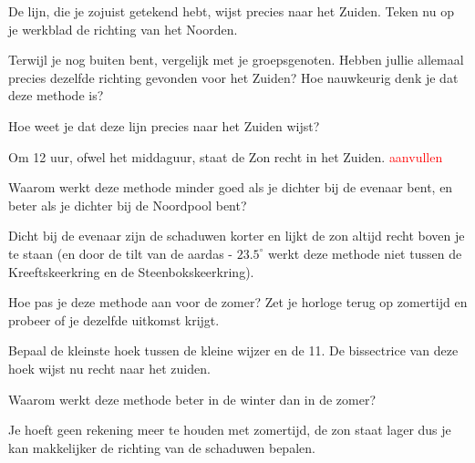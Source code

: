 De lijn, die je zojuist getekend hebt, wijst precies naar het Zuiden. Teken nu op je werkblad de richting van het Noorden.

\begin{opgave}[\discussie]
    Terwijl je nog buiten bent, vergelijk met je groepsgenoten. Hebben jullie allemaal precies dezelfde richting gevonden voor het Zuiden? Hoe nauwkeurig denk je dat deze methode is?
\end{opgave}

\begin{opgave}
    Hoe weet je dat deze lijn precies naar het Zuiden wijst?
    \begin{antwoord}
        Om 12 uur, ofwel het middaguur, staat de Zon recht in het Zuiden. \textcolor{red}{aanvullen}
    \end{antwoord}
\end{opgave}

\begin{opgave}
    Waarom werkt deze methode minder goed als je dichter bij de evenaar bent, en beter als je dichter bij de Noordpool bent? 
    \begin{antwoord}
        Dicht bij de evenaar zijn de schaduwen korter en lijkt de zon altijd recht boven je te staan (en door de tilt van de aardas - $23.5^{\circ}$ werkt deze methode niet tussen de Kreeftskeerkring en de Steenbokskeerkring).
    \end{antwoord}
\end{opgave}

\begin{opgave}[\schaar]
    Hoe pas je deze methode aan voor de zomer? Zet je horloge terug op zomertijd en probeer of je dezelfde uitkomst krijgt.
    \begin{antwoord}
        Bepaal de kleinste hoek tussen de kleine wijzer en de 11. De bissectrice van deze hoek wijst nu recht naar het zuiden.   
    \end{antwoord}
\end{opgave}

\begin{opgave}
    Waarom werkt deze methode beter in de winter dan in de zomer? 
    \begin{antwoord}
        Je hoeft geen rekening meer te houden met zomertijd, de zon staat lager dus je kan makkelijker de richting van de schaduwen bepalen.
    \end{antwoord}
\end{opgave}

